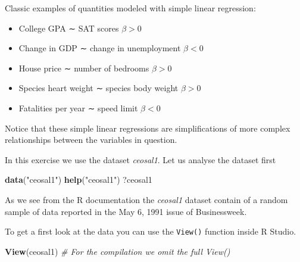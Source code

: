 \documentclass[]{book}
\newenvironment{Shaded}{\begin{snugshade}}{\end{snugshade}}
\newcommand{\CommentTok}[1]{\textcolor[rgb]{0.56,0.35,0.01}{\textit{#1}}}
\newcommand{\KeywordTok}[1]{\textcolor[rgb]{0.13,0.29,0.53}{\textbf{#1}}}
\newcommand{\NormalTok}[1]{#1}
\newcommand{\StringTok}[1]{\textcolor[rgb]{0.31,0.60,0.02}{#1}}
\providecommand{\tightlist}{%
  \setlength{\itemsep}{0pt}\setlength{\parskip}{0pt}}
\begin{document}
Classic examples of quantities modeled with simple linear regression:

\begin{itemize}
\tightlist
\item
  College GPA ∼ SAT scores \(\beta > 0\)
\item
  Change in GDP ∼ change in unemployment \(\beta < 0\)
\item
  House price ∼ number of bedrooms \(\beta > 0\)
\item
  Species heart weight ∼ species body weight \(\beta > 0\)
\item
  Fatalities per year ∼ speed limit \(\beta < 0\)
\end{itemize}

Notice that these simple linear regressions are simplifications of more
complex relationships between the variables in question.

In this exercise we use the dataset \emph{ceosal1}. Let us analyse the
dataset first

\begin{Shaded}
\begin{Highlighting}[]
\KeywordTok{data}\NormalTok{(}\StringTok{"ceosal1"}\NormalTok{)}
\KeywordTok{help}\NormalTok{(}\StringTok{"ceosal1"}\NormalTok{)}
\NormalTok{?ceosal1}
\end{Highlighting}
\end{Shaded}

As we see from the R documentation the \emph{ceosal1} dataset contain of
a random sample of data reported in the May 6, 1991 issue of
Businessweek.

To get a first look at the data you can use the \texttt{View()} function
inside R Studio.

\begin{Shaded}
\begin{Highlighting}[]
\KeywordTok{View}\NormalTok{(ceosal1) }\CommentTok{# For the compilation we omit the full View()}
\end{Highlighting}
\end{Shaded}
\end{document}
